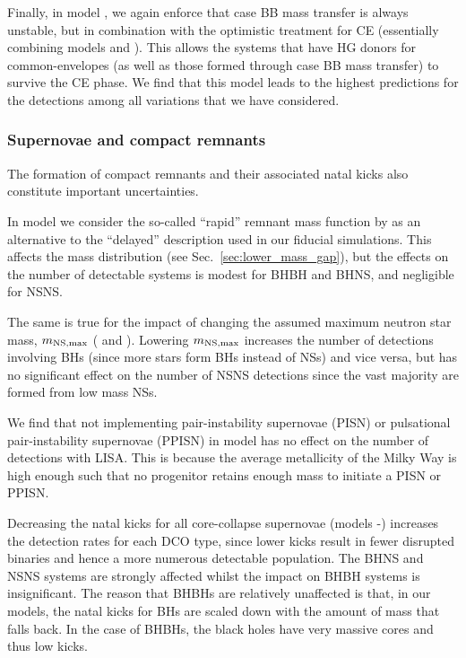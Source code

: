 Finally, in model \modCaseBBOpt{}, we again enforce that case BB mass transfer is always unstable, but in combination with the optimistic treatment for CE (essentially combining models \modCaseBB{} and \modOpt{}). This allows the systems that have HG donors for common-envelopes (as well as those formed through case BB mass transfer) to survive the CE phase. We find that this model leads to the highest predictions for the detections among all variations that we have considered.

\subsubsection{Supernovae and compact remnants}

The formation of compact remnants and their associated natal kicks also constitute important uncertainties.  

In model \modRapid{} we consider the so-called ``rapid'' remnant mass function by \citet{Fryer+2015} as an alternative to the ``delayed'' description used in our fiducial simulations. This affects the mass distribution (see Sec.~\ref{sec:lower_mass_gap}), but the effects on the number of detectable systems is modest for BHBH and BHNS, and negligible for NSNS.  

The same is true for the impact of changing the assumed maximum neutron star mass, $m_{\rm NS, max}$ (\modNSLow{} and \modNSHigh{}). Lowering $m_{\rm NS, max}$ increases the number of detections involving BHs (since more stars form BHs instead of NSs) and vice versa, but has no significant effect on the number of NSNS detections since the vast majority are formed from low mass NSs.

We find that not implementing pair-instability supernovae (PISN) or pulsational pair-instability supernovae (PPISN) in model \modNoPISN{} has no effect on the number of detections with LISA. This is because the average metallicity of the Milky Way is high enough such that no progenitor retains enough mass to initiate a PISN or PPISN.

Decreasing the natal kicks for all core-collapse supernovae (models \modSigLow{}-\modSigLower{}) increases the detection rates for each DCO type, since lower kicks result in fewer disrupted binaries and hence a more numerous detectable population. The BHNS and NSNS systems are strongly affected whilst the impact on BHBH systems is insignificant. The reason that BHBHs are relatively unaffected is that, in our models, the natal kicks for BHs are scaled down with the amount of mass that falls back. In the case of BHBHs, the black holes have very massive cores and thus low kicks.

